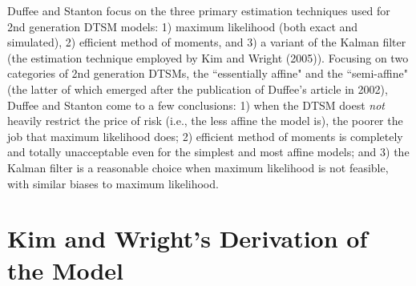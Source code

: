 \documentclass[12pt,final]{article}
\begin{document}
Duffee and Stanton focus on the three primary estimation techniques used for 2nd generation DTSM models: 1) maximum likelihood (both exact and simulated), 2) efficient method of moments, and 3) a variant of the Kalman filter (the estimation technique employed by Kim and Wright (2005)). \citep{Duffee2012} \citep{Kim2005} Focusing on two categories of 2nd generation DTSMs, the ``essentially affine" and the ``semi-affine" (the latter of which emerged after the publication of Duffee's article in 2002), Duffee and Stanton come to a few conclusions: 1) when the DTSM doest \textit{not} heavily restrict the price of risk (i.e., the less affine the model is), the poorer the job that maximum likelihood does; 2) efficient method of moments is completely and totally unacceptable even for the simplest and most affine models; and 3) the Kalman filter is a reasonable choice when maximum likelihood is not feasible, with similar biases to maximum likelihood. 

\section{Kim and Wright's Derivation of the Model}
\begin{comment}
With this context in mind, let's examine Kim and Wright's (2005) employment of a 3-factor arbitrage-free DTSM. They begin with creating a system of equations to represent the price of a nominal, $n$-period real zero-coupon bond; the bond is priced at $t$ pays one unit at time $t+n$. The representative investor has a basic utility function $u(c_t)$ that is only a function of consumption, $c_t$ of the form:
\begin{gather}
	\sum^{\infty}_{j = 0} \beta^ju(c_{t+j})
\end{gather}
In order to maximize utility of this form, the price of this $n$-period, real zero-coupon bond is given by the following equation:
\begin{gather}
	P^R_{n,t} = E_t(\beta^n\frac{u'(c_{t+n})}{u'(c_t)})
\end{gather}
where $u'(t)$ is the utility function derived with respect to time, indicating marginal utility at time $t$. What does this equation mean intuitively? Recall that the bond pays off one unit of consumption in time $t+n$; thus, the ratio of marginal utility in time $t+n$, when the bond will be paid out, and marginal utility in time $t$, when the bond is bought, captures the relative importance of future consumption to present consumption. If marginal utility was greater tomorrow than it was today for an investor, then that investor would pay something to consume tomorrow rather than today--meaning $P > 1$.
\end{comment}
\end{document}
